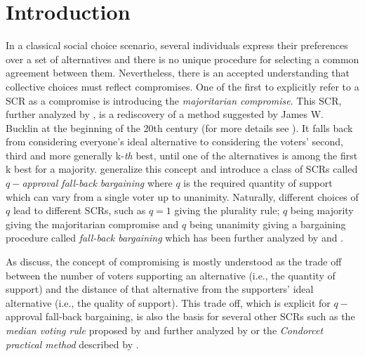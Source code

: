 \documentclass[version=3.21, pagesize, twoside=off, bibliography=totoc, DIV=calc, fontsize=12pt, a4paper]{scrartcl}
\begin{document}
\section{Introduction}
\label{sec:introduction}
In a classical social choice scenario, several individuals express their preferences over a set of alternatives and there is no unique procedure for selecting a common agreement between them. Nevertheless, there is an accepted understanding that collective choices must reflect compromises. One of the first to explicitly refer to a \ac{SCR} as a compromise is \citet{Sertel1986} introducing the \textit{majoritarian compromise}. This \ac{SCR}, further analyzed by \citet{Sertel1999}, is a rediscovery of a method suggested by James W. Bucklin at the beginning of the 20th century (for more details see \citet{Erdelyi2015}). It falls back from considering everyone’s ideal alternative to considering the voters’ second, third and more generally k-\emph{th} best, until one of the alternatives is among the first k best for a majority. \citet{Brams2001} generalize this concept and introduce a class of \acp{SCR} called $q-$\textit{approval fall-back bargaining }where $q$ is the required quantity of support which can vary from a single voter up to unanimity. Naturally, different choices of $q$ lead to different \acp{SCR}, such as $q=1$ giving the plurality rule; $q$ being majority giving the majoritarian compromise and $q$ being unanimity giving a bargaining procedure called \textit{fall-back bargaining} which has been further analyzed by \citet{Kibris2007} and \citet{Congar2012}. 

As \citet{OezkalSanver2004} discuss, the concept of compromising is mostly understood as the trade off between the number of voters supporting an alternative (i.e., the quantity of support) and the distance of that alternative from the supporters' ideal alternative (i.e., the quality of support). This trade off, which is explicit for $q-$approval fall-back bargaining, is also the basis for several other \acp{SCR} such as the \textit{median voting rule} proposed by \citet{Bassett1999} and further analyzed by \citet{Gehrlein2003} or the \textit{Condorcet practical method }described by \citet{Nurmi1999}.
\end{document}

